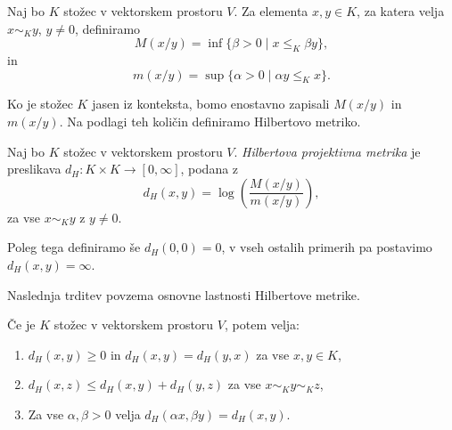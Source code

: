 \documentclass[mat2, tisk]{fmfdelo}
\begin{document}
\begin{definicija}
  Naj bo $K$ stožec v vektorskem prostoru $V$. Za elementa
  $x,y\in K$, za katera velja $x \sim_K y$, $ y\neq0$, definiramo
  \[
  M(x/y)=\inf\{\beta>0 \mid x\le_K \beta y\},
  \]
  in
  \[
  m(x/y)=\sup\{\alpha>0 \mid \alpha y\le_K x\}.
  \]
\end{definicija}

Ko je stožec $K$ jasen iz konteksta, bomo enostavno zapisali $M(x/y)$ in $m(x/y)$.
Na podlagi teh količin definiramo Hilbertovo metriko.

\begin{definicija}
Naj bo $K$ stožec v vektorskem prostoru $V$.
\emph{Hilbertova projektivna metrika} je preslikava
$d_H:K\times K\longrightarrow[0,\infty]$,
podana z
\[
d_H(x,y)=
\log\!\left(
\frac{M(x/y)}{m(x/y)}
\right),
\]
za vse $x\sim_K y$ z $y\neq0$.

Poleg tega definiramo še $d_H(0,0)=0$,
v vseh ostalih primerih pa postavimo $d_H(x,y)=\infty$.
\end{definicija}

Naslednja trditev povzema osnovne lastnosti Hilbertove metrike.

\begin{trditev}\label{trd3.3}
Če je $K$ stožec v vektorskem prostoru $V$, potem velja:
\begin{enumerate}
\item $d_H(x,y) \ge 0$ in $d_H(x,y)=d_H(y,x)$ za vse $x,y\in K$,
\item $d_H(x,z) \le d_H(x,y)+d_H(y,z)$ za vse $x\sim_K y\sim_K z$,
\item Za vse $\alpha,\beta>0$ velja $d_H(\alpha x,\beta y)=d_H(x,y)$.
\end{enumerate}
\end{trditev}
\end{document}
